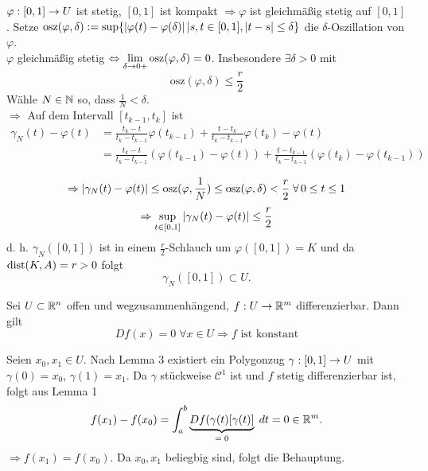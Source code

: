 \documentclass[../ana2.tex]{subfiles}
\begin{document}
\begin{bew}
    \begin{bew}\renewcommand{\qedsymbol}{}
        \(\abb{\varphi}{[0,1]}{U}\) ist stetig, 
        \( [0,1] \) ist kompakt \( \Rightarrow 
        \varphi \) ist gleichmäßig stetig auf 
        \( [0,1] \).
        Setze \(\mathrm{osz}(\varphi, \delta) := \sup 
        \set{\abs{\varphi(t)- \varphi(\delta)} \vert s,t \in [0,1], \abs{t-s} \leq \delta}\)
        die \(\delta\)-Oszillation von \( \varphi \).\\
        \( \varphi \) gleichmäßig stetig 
        \( \Leftrightarrow \limesx{\delta}{0+} 
        \mathrm{osz}(\varphi, \delta) = 0 \).
        Insbesondere \(\exists \delta > 0\) mit
        \[ \mathrm{osz}(\varphi, \delta) \leq \frac{r}{2} \]
        Wähle \(N \in \N\) so, dass \(\frac{1}{N} < \delta\).\\
        \( \Rightarrow \) Auf dem Intervall 
        \( [t_{k-1}, t_k] \) ist
        \begin{align*}
            \gamma_N(t) - \varphi(t) 
            &= \frac{t_{k} - t}{t_k - t_{k-1}}\varphi(t_{k-1})
            + \frac{ t - t_k }{ t_k - t_{k-1} }\varphi(t_k) 
            - \varphi(t) \\
            &= \frac{ t_k - t }{t_k - t_{k-1}} (\varphi(t_{k-1}) - \varphi(t)) 
            + \frac{ t - t_{k-1} }{t_k - t_{k-1}}(\varphi(t_k) - \varphi(t_{k-1}))
        \end{align*}
        
        \[ \Rightarrow \abs{\gamma_N(t) - \varphi(t)} 
        \leq \mathrm{osz}(\varphi, \frac{1}{N})
        \leq \mathrm{osz}(\varphi, \delta) < \frac{r}{2} 
        \; \forall 0 \leq t \leq 1 \]
        \[ \Rightarrow \underset{t \in [0,1]}{\sup} 
        \abs{\gamma_N(t)-\varphi(t)} \leq \frac{r}{2} \]
        d. h. \( \gamma_N([0,1]) \) ist in einem \(\frac{r}{2}\)-Schlauch um
        \(\varphi([0,1]) = K\) und da \(\dist(K,A) = r > 0\) folgt
        \[ \gamma_N([0,1]) \subset U. \]        
    \end{bew}
\end{bew}
\begin{satz}
    Sei \(U \subset \R^n\) offen und wegzusammenhängend,
    \( \abb{f}{U}{\R^m} \) differenzierbar. Dann gilt
    \[ Df(x) = 0 \; \forall x \in U \Rightarrow f \text{ ist konstant} \]
\end{satz}
\begin{satz}
    Seien \(x_0, x_1 \in U\). Nach Lemma 3 existiert ein Polygonzug
    \( \abb{\gamma}{[0,1]}{U} \) mit \( \gamma(0) = x_0 \), 
    \( \gamma(1) = x_1 \).
    Da \( \gamma \) stückweise \(\mathcal{C}^1\) ist und \(f\) stetig
    differenzierbar ist, folgt aus Lemma 1 
    \[ f(x_1)-f(x_0) = \integralx{\underbrace{Df(\gamma(t)[\gamma(t)]}_{=\; 0}}{a}{b}{t} 
    = 0 \in \R^m. \]
    \( \Rightarrow f(x_1) = f(x_0) \). Da \( x_0, x_1 \) beliegbig sind, 
    folgt die Behauptung.
\end{satz}
\end{document}
